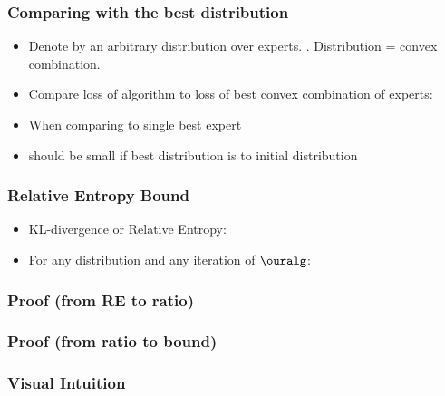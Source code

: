 \documentclass[handout]{beamer}
\begin{document}
\renewcommand{\vecq}{\bdistvec{}}
\begin{frame}
  \frametitle{Comparing with the best distribution}
  \begin{itemize}
  \item Denote by \R{$\vecq$} an arbitrary distribution over 
    experts. \R{$\vecq \in \Delta^N$}. Distribution = convex combination.
  \item Compare loss of algorithm to loss of best
    convex combination of experts:
  \R{\[ \sum_{t=1}^T L_A^t \leq + a \min_{\vecq \in
        \Delta^N} \sum_{t=1}^T \vecq \cdot \costvec{t} + c X \]}
  \item When comparing to single best expert 
  \item {}  should be small if best distribution
    \R{$\vecq^*$} is  to initial distribution 
  \end{itemize}
\end{frame}

  \begin{frame}
    \frametitle{Relative Entropy Bound}
    \begin{itemize}
  \item KL-divergence or Relative Entropy:
  \item For any distribution \R{$\vecq$} and any iteration of
    $\ouralg$:
    \end{itemize}
\end{frame}

\begin{frame}
\frametitle{Proof (from RE to ratio)}
\end{frame}

\begin{frame}
\frametitle{Proof (from ratio to bound)}
\end{frame}

\begin{frame}
\frametitle{Visual Intuition}
\end{frame}
\end{document}
